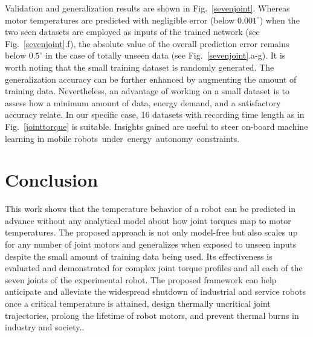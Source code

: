 \documentclass{ifacconf}
\begin{document}
Validation and generalization results are shown in Fig.~\ref{sevenjoint}. Whereas motor temperatures are predicted with negligible error (below $0.001^\circ$) when the two seen  datasets are employed as inputs of the trained network (see Fig.~\ref{sevenjoint}.f), the absolute value of the overall prediction error remains below $0.5^\circ$ in the case of totally unseen data (see  Fig.~\ref{sevenjoint}.a-g). It is worth noting that the small training dataset is randomly generated. The generalization accuracy can be further enhanced by augmenting the amount of training data. Nevertheless, an advantage of working on a small dataset is to assess how a minimum amount of data, energy demand, and a satisfactory accuracy relate. In our specific case, 16 datasets with recording time length as in Fig.~\ref{jointtorque} is suitable. Insights gained are useful to steer on-board machine learning in  mobile \mbox{robots under energy autonomy constraints.}








\section{Conclusion}
This work shows that the temperature behavior of a robot can be predicted in advance without any analytical  model about how joint torques map to motor temperatures. The proposed approach is not only model-free but also scales up for any number of joint motors and generalizes when exposed to  unseen inputs despite the small amount of training data being used. Its effectiveness is evaluated and demonstrated for complex joint torque profiles and all each of the seven joints of the experimental robot. The proposed framework can help anticipate and alleviate the widespread shutdown  of industrial and service robots once a critical temperature  is attained, design thermally uncritical joint trajectories, prolong the lifetime of robot motors, and prevent thermal burns in industry and society..


                                                   
\end{document}
